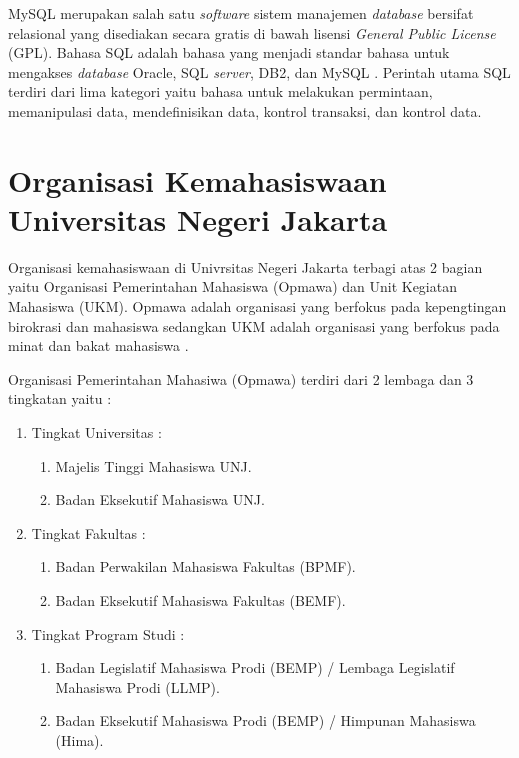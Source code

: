 MySQL merupakan salah satu \emph{software} sistem manajemen \emph{database} bersifat relasional yang disediakan secara gratis di bawah lisensi \emph{General Public License} (GPL). Bahasa SQL adalah bahasa yang menjadi standar bahasa untuk mengakses \emph{database} Oracle, SQL \emph{server}, DB2, dan MySQL \cite{andreea}. Perintah utama SQL terdiri dari lima kategori yaitu bahasa untuk melakukan permintaan, memanipulasi data, mendefinisikan data, kontrol transaksi, dan kontrol data. 

\section{Organisasi Kemahasiswaan Universitas Negeri Jakarta}

Organisasi kemahasiswaan di Univrsitas Negeri Jakarta terbagi atas 2 bagian yaitu Organisasi Pemerintahan Mahasiswa (Opmawa) dan Unit Kegiatan Mahasiswa (UKM). Opmawa adalah organisasi yang berfokus pada kepengtingan birokrasi dan mahasiswa sedangkan UKM adalah organisasi yang berfokus pada minat dan bakat mahasiswa \cite{sartika}.

Organisasi Pemerintahan Mahasiwa (Opmawa) terdiri dari 2 lembaga dan 3 tingkatan yaitu : 
\begin{enumerate}
	\item Tingkat Universitas :
	\begin{enumerate}
		\item Majelis Tinggi Mahasiswa UNJ.
		\item Badan Eksekutif Mahasiswa UNJ.
	\end{enumerate}
	\item Tingkat Fakultas :
	\begin{enumerate}
		\item Badan Perwakilan Mahasiswa Fakultas (BPMF).
		\item Badan Eksekutif Mahasiswa Fakultas (BEMF).
	\end{enumerate} 
	\item Tingkat Program Studi :
	\begin{enumerate}
		\item Badan Legislatif Mahasiswa Prodi (BEMP) / Lembaga Legislatif Mahasiswa Prodi (LLMP).
		\item Badan Eksekutif Mahasiswa Prodi (BEMP) / Himpunan Mahasiswa (Hima).
	\end{enumerate}
\end{enumerate}

